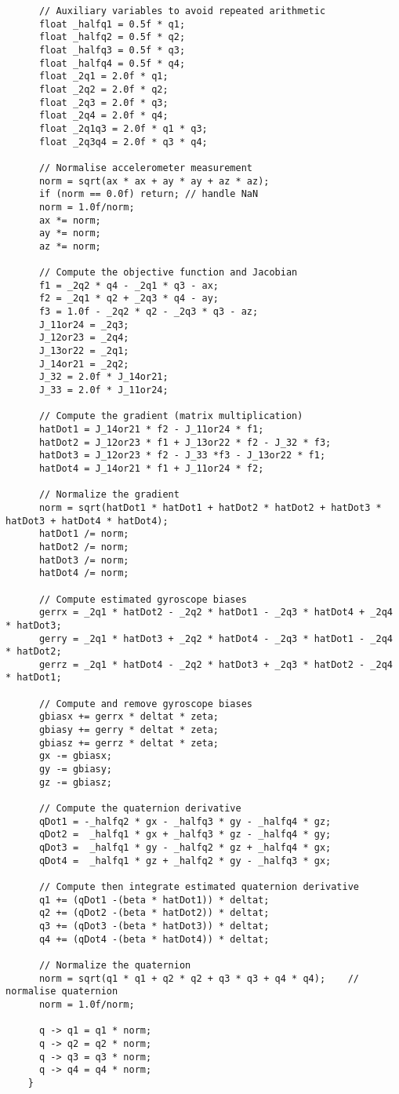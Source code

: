 \begin{lstlisting}
	  // Auxiliary variables to avoid repeated arithmetic
	  float _halfq1 = 0.5f * q1;
	  float _halfq2 = 0.5f * q2;
	  float _halfq3 = 0.5f * q3;
	  float _halfq4 = 0.5f * q4;
	  float _2q1 = 2.0f * q1;
	  float _2q2 = 2.0f * q2;
	  float _2q3 = 2.0f * q3;
	  float _2q4 = 2.0f * q4;
	  float _2q1q3 = 2.0f * q1 * q3;
	  float _2q3q4 = 2.0f * q3 * q4;

	  // Normalise accelerometer measurement
	  norm = sqrt(ax * ax + ay * ay + az * az);
	  if (norm == 0.0f) return; // handle NaN
	  norm = 1.0f/norm;
	  ax *= norm;
	  ay *= norm;
	  az *= norm;
	  
	  // Compute the objective function and Jacobian
	  f1 = _2q2 * q4 - _2q1 * q3 - ax;
	  f2 = _2q1 * q2 + _2q3 * q4 - ay;
	  f3 = 1.0f - _2q2 * q2 - _2q3 * q3 - az;
	  J_11or24 = _2q3;
	  J_12or23 = _2q4;
	  J_13or22 = _2q1;
	  J_14or21 = _2q2;
	  J_32 = 2.0f * J_14or21;
	  J_33 = 2.0f * J_11or24;

	  // Compute the gradient (matrix multiplication)
	  hatDot1 = J_14or21 * f2 - J_11or24 * f1;
	  hatDot2 = J_12or23 * f1 + J_13or22 * f2 - J_32 * f3;
	  hatDot3 = J_12or23 * f2 - J_33 *f3 - J_13or22 * f1;
	  hatDot4 = J_14or21 * f1 + J_11or24 * f2;
	  
	  // Normalize the gradient
	  norm = sqrt(hatDot1 * hatDot1 + hatDot2 * hatDot2 + hatDot3 * hatDot3 + hatDot4 * hatDot4);
	  hatDot1 /= norm;
	  hatDot2 /= norm;
	  hatDot3 /= norm;
	  hatDot4 /= norm;
	  
	  // Compute estimated gyroscope biases
	  gerrx = _2q1 * hatDot2 - _2q2 * hatDot1 - _2q3 * hatDot4 + _2q4 * hatDot3;
	  gerry = _2q1 * hatDot3 + _2q2 * hatDot4 - _2q3 * hatDot1 - _2q4 * hatDot2;
	  gerrz = _2q1 * hatDot4 - _2q2 * hatDot3 + _2q3 * hatDot2 - _2q4 * hatDot1;
	  
	  // Compute and remove gyroscope biases
	  gbiasx += gerrx * deltat * zeta;
	  gbiasy += gerry * deltat * zeta;
	  gbiasz += gerrz * deltat * zeta;
	  gx -= gbiasx;
	  gy -= gbiasy;
	  gz -= gbiasz;
	  
	  // Compute the quaternion derivative
	  qDot1 = -_halfq2 * gx - _halfq3 * gy - _halfq4 * gz;
	  qDot2 =  _halfq1 * gx + _halfq3 * gz - _halfq4 * gy;
	  qDot3 =  _halfq1 * gy - _halfq2 * gz + _halfq4 * gx;
	  qDot4 =  _halfq1 * gz + _halfq2 * gy - _halfq3 * gx;

	  // Compute then integrate estimated quaternion derivative
	  q1 += (qDot1 -(beta * hatDot1)) * deltat;
	  q2 += (qDot2 -(beta * hatDot2)) * deltat;
	  q3 += (qDot3 -(beta * hatDot3)) * deltat;
	  q4 += (qDot4 -(beta * hatDot4)) * deltat;

	  // Normalize the quaternion
	  norm = sqrt(q1 * q1 + q2 * q2 + q3 * q3 + q4 * q4);    // normalise quaternion
	  norm = 1.0f/norm;

	  q -> q1 = q1 * norm;
	  q -> q2 = q2 * norm;
	  q -> q3 = q3 * norm;
	  q -> q4 = q4 * norm;
	}
	\end{lstlisting}


